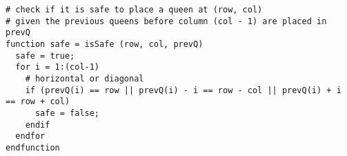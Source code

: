 \documentclass[12pt,a4paper,hidelinks,fleqn]{article}            %
\begin{document}
\begin{verbatim}
# check if it is safe to place a queen at (row, col)                                                                                         
# given the previous queens before column (col - 1) are placed in prevQ                                                                      
function safe = isSafe (row, col, prevQ)                                                                                                     
  safe = true;                                                                                                                               
  for i = 1:(col-1)                                                                                                                          
    # horizontal or diagonal                                                                                                                 
    if (prevQ(i) == row || prevQ(i) - i == row - col || prevQ(i) + i == row + col)                                                           
      safe = false;                                                                                                                          
    endif                                                                                                                                    
  endfor                                                                                                                                     
endfunction                                                                                                                                  
                                                                                                                                             

\end{verbatim}
\end{document}
